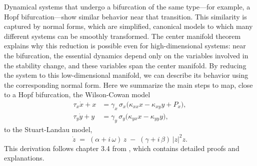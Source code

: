 Dynamical systems that undergo a bifurcation of the same type—for example, a Hopf bifurcation—show similar behavior near that transition.
This similarity is captured by normal forms, which are simplified, canonical models to which many different systems can be smoothly transformed.
The center manifold theorem explains why this reduction is possible even for high-dimensional systems: near the bifurcation, the essential dynamics depend only on the variables involved in the stability change, and these variables span the center manifold.
By reducing the system to this low-dimensional manifold, we can describe its behavior using the corresponding normal form.
Here we summarize the main steps to map, close to a Hopf bifurcation, the Wilson-Cowan model
\begin{equation}
    \begin{aligned}
  \tau_x \dot{x}+x &= \gamma_x\,\sigma_x\!\bigl(\kappa_{xx}x - \kappa_{xy}y + P_x\bigr),\\
  \tau_y \dot{y}+y &= \gamma_y\,\sigma_y\!\bigl(\kappa_{yx}x - \kappa_{yy}y\bigr),
\end{aligned}
\end{equation}
to the Stuart-Landau model,
\begin{equation}\label{eq:SLappendix}
\dot{z} \;=\; (\alpha + i\,\omega)\,z \;-\; (\gamma + i\,\beta)\,\lvert z\rvert^{2}z.
\end{equation}
This derivation follows chapter 3.4 from \cite{kuznetsov2023elements}, which contains detailed proofs and explanations.


